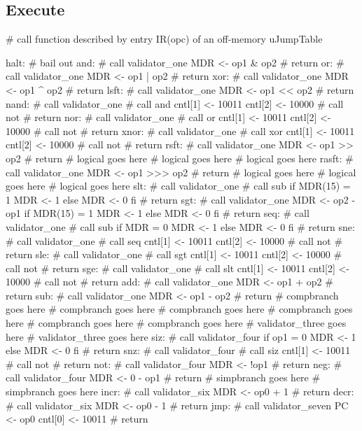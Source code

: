 \documentclass[12pt]{article}
\begin{document}
\subsection{Execute}
\begin{verbatimtab}
# call function described by entry IR(opc) of an off-memory uJumpTable

halt:
	# bail out
and:
    # call validator_one
    MDR <- op1 & op2
    # return
or:
    # call validator_one
    MDR <- op1 | op2
    # return
xor:
    # call validator_one
    MDR <- op1 ^ op2
    # return
lsft:
    # call validator_one
    MDR <- op1 << op2
    # return
nand:
    # call validator_one
    # call and
    cntl[1] <- 10011
    cntl[2] <- 10000
    # call not
    # return
nor:
    # call validator_one
    # call or
    cntl[1] <- 10011
    cntl[2] <- 10000
    # call not
    # return
xnor:
    # call validator_one
    # call xor
    cntl[1] <- 10011
    cntl[2] <- 10000
    # call not
    # return
rsft:
    # call validator_one
    MDR <- op1 >> op2
    # return
# logical goes here
# logical goes here
# logical goes here
rasft:
    # call validator_one
    MDR <- op1 >>> op2
    # return
# logical goes here
# logical goes here
# logical goes here
slt:
    # call validator_one
    # call sub
    if MDR(15) = 1
        MDR <- 1
    else
        MDR <- 0
	fi
    # return
sgt:
    # call validator_one
    MDR <- op2 - op1
    if MDR(15) = 1
        MDR <- 1
    else
        MDR <- 0
	fi
    # return
seq:
    # call validator_one
    # call sub
    if MDR = 0
        MDR <- 1
    else
        MDR <- 0
	fi
    # return
sne:
    # call validator_one
    # call seq
    cntl[1] <- 10011
    cntl[2] <- 10000
    # call not
    # return
sle:
    # call validator_one
    # call sgt
    cntl[1] <- 10011
    cntl[2] <- 10000
    # call not
    # return
sge:
    # call validator_one
    # call slt
    cntl[1] <- 10011
    cntl[2] <- 10000
    # call not
    # return
add:
    # call validator_one
    MDR <- op1 + op2
    # return
sub:
    # call validator_one
    MDR <- op1 - op2
    # return
# compbranch goes here
# compbranch goes here
# compbranch goes here
# compbranch goes here
# compbranch goes here
# compbranch goes here
# validator_three goes here
# validator_three goes here
siz:
    # call validator_four
    if op1 = 0
       MDR <- 1
    else
       MDR <- 0
	fi
    # return
snz:
    # call validator_four
    # call siz
    cntl[1] <- 10011 
    # call not
    # return
not:
    # call validator_four
    MDR <- !op1
    # return
neg:
    # call validator_four
    MDR <- 0 - op1
    # return
# simpbranch goes here
# simpbranch goes here
incr:
	# call validator_six
	MDR <- op0 + 1
	# return
decr:
	# call validator_six
	MDR <- op0 - 1
	# return
jmp:
    # call validator_seven
    PC <- op0
    cntl[0] <- 10011
    # return


\end{verbatimtab}
\end{document}

